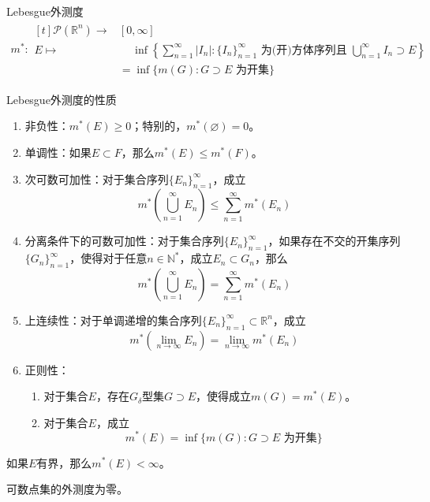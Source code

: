 \documentclass[lang = cn, scheme = chinese, thmcnt = section]{elegantbook}
\newcommand{\N}{\mathbb{N}}            %
\newcommand{\R}{\mathbb{R}}            %
\newcommand{\sub}{\subset}             %
\begin{document}
\begin{definition}{Lebesgue外测度}
	\begin{align*}
		m^*:\begin{aligned}[t]
			\mathscr{P}(\R^n) \longrightarrow&[0,\infty]\\
			E \longmapsto&\quad \,\inf\left\{ \sum_{n=1}^{\infty}|I_n|:\{I_n\}_{n=1}^{\infty}\text{ 为(开)方体序列且 } \bigcup_{n=1}^{\infty}I_n\supset E \right\}\\
			&=\inf\{ m(G):G\supset E\text{ 为开集} \}
		\end{aligned}
	\end{align*}
\end{definition}

\begin{theorem}{Lebesgue外测度的性质}
	\begin{enumerate}
		\item 非负性：$m^*(E)\ge 0$；特别的，$m^*(\varnothing)=0$。
		\item 单调性：如果$E\sub F$，那么$m^*(E)\le m^*(F)$。
		\item 次可数可加性：对于集合序列$\{ E_n \}_{n=1}^{\infty}$，成立
		$$
		m^*\left(\bigcup_{n=1}^{\infty}{E_n}\right)\le\sum_{n=1}^{\infty}{m^*(E_n)}
		$$
		\item 分离条件下的可数可加性：对于集合序列$\{ E_n \}_{n=1}^{\infty}$，如果存在不交的开集序列$\{ G_n \}_{n=1}^{\infty}$，使得对于任意$n\in\N^*$，成立$E_n\sub G_n$，那么
		$$
		m^*\left(\bigcup_{n=1}^{\infty}{E_n}\right)=\sum_{n=1}^{\infty}{m^*(E_n)}
		$$
		\item 上连续性：对于单调递增的集合序列$\{ E_n \}_{n=1}^{\infty}\sub\R^n$，成立
		$$
		m^*\left(\lim_{n\to\infty}{E_n}\right)=\lim_{n\to\infty}{m^*(E_n)}
		$$
		\item 正则性：
		\begin{enumerate}
			\item 对于集合$E$，存在$G_\delta$型集$G\supset E$，使得成立$m(G)=m^*(E)$。
			\item 对于集合$E$，成立
			$$
			m^*(E)=\inf\{ m(G):G\supset E\text{ 为开集} \}
			$$
		\end{enumerate}
	\end{enumerate}
\end{theorem}

\begin{exercise}
	如果$E$有界，那么$m^*(E)<\infty$。
\end{exercise}

\begin{exercise}
	可数点集的外测度为零。
\end{exercise}
\end{document}
